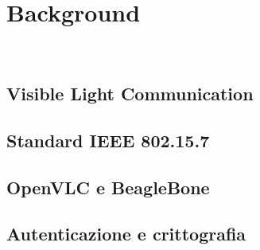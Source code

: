 \chapter{Background}
\label{cap:background}

\\

\section{Visible Light Communication}

\section{Standard IEEE 802.15.7}

\section{OpenVLC e BeagleBone}

\section{Autenticazione e crittografia}

